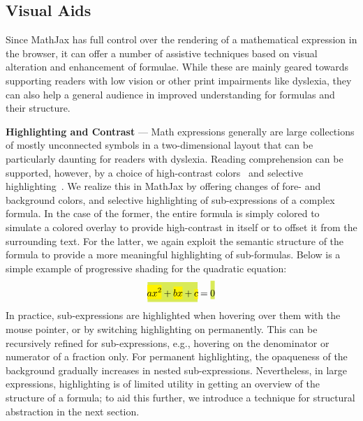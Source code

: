 \documentclass{sig-alternate}
\begin{document}
\def\myparagraph#1{\vspace{1ex}\noindent\textbf{#1} ---}

\subsection{Visual Aids}

Since MathJax has full control over the rendering of a mathematical expression
in the browser, it can offer a number of assistive techniques based on visual
alteration and enhancement of formulae. While these are mainly geared towards
supporting readers with low vision or other print impairments like dyslexia,
they can also help a general audience in improved understanding for formulas and
their structure.

\myparagraph{Highlighting and Contrast} Math expressions generally are large
collections of mostly unconnected symbols in a two-dimensional layout that can
be particularly daunting for readers with dyslexia.  Reading comprehension can
be supported, however, by a choice of high-contrast
colors~\cite{rello2012optimal} and selective
highlighting~\cite{jones2008strategies}. We realize this in MathJax by offering
changes of fore- and background colors, and selective highlighting of
sub-expressions of a complex formula. In the case of the former, the entire
formula is simply colored to simulate a colored overlay to provide high-contrast
in itself or to offset it from the surrounding text.  For the latter, we again
exploit the semantic structure of the formula to provide a more meaningful
highlighting of sub-formulas. Below is a simple example of progressive shading
for the quadratic equation:
\def\cb#1{\colorbox{yellow}{\ensuremath{\!\!\displaystyle#1\!\!}}}
\def\cc#1{\colorbox{GreenYellow}{\ensuremath{\!\!\displaystyle#1\!\!}}}
\[\cc{\cb{ax^2} + \cb{bx} + \cb{c}} = \cc{\rule[3ex]{0pt}{0pt}0}\]
In practice, sub-expressions are highlighted when hovering over them with the
mouse pointer, or by switching highlighting on permanently. This can be
recursively refined for sub-expressions, e.g., hovering on the denominator or
numerator of a fraction only. For permanent highlighting, the opaqueness of the
background gradually increases in nested sub-expressions. Nevertheless, in large
expressions, highlighting is of limited utility in getting an overview of the structure
of a formula; to aid this further, we introduce a technique for
structural abstraction in the next section.
\end{document}
